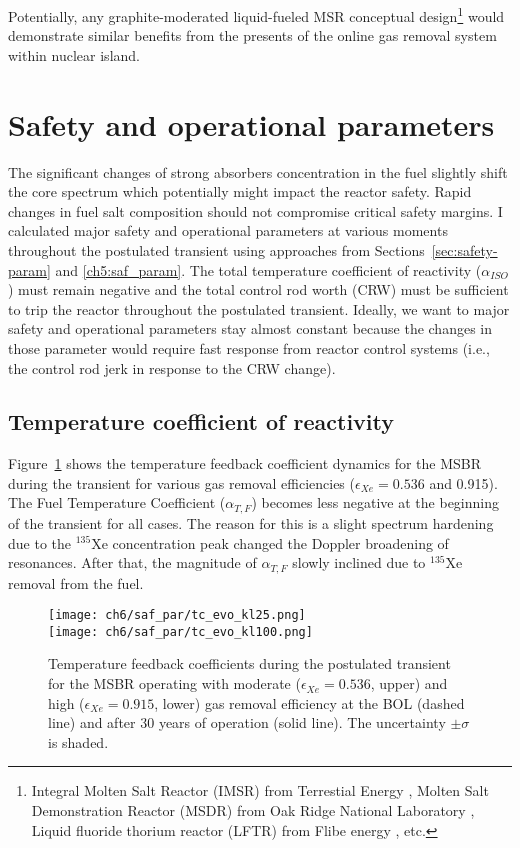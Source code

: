 Potentially, any graphite-moderated liquid-fueled \gls{MSR} conceptual 
design\footnote{Integral Molten Salt Reactor (IMSR) from Terrestial Energy 
\cite{leblanc_integral_nodate}, Molten Salt Demonstration Reactor (MSDR) from 
Oak Ridge National Laboratory \cite{bettis_design_1972}, Liquid fluoride 
thorium reactor (LFTR) from Flibe energy \cite{sorensen_liquid-fluoride_2016}, 
etc.} would demonstrate similar benefits from the presents of the online gas 
removal system within nuclear island.


\section{Safety and operational parameters}
The significant changes of strong absorbers concentration in the fuel slightly 
shift the core spectrum which potentially might impact the reactor safety.
Rapid changes in fuel salt composition should not compromise critical safety 
margins.
I calculated major safety and operational parameters at various moments 
throughout the postulated transient using approaches from 
Sections~\ref{sec:safety-param} and \ref{ch5:saf_param}. 
The total temperature coefficient of reactivity ($\alpha_{ISO}$) must remain 
negative and the total control rod worth (CRW) must be sufficient to trip the 
reactor throughout the postulated transient. Ideally, we want to major safety 
and operational parameters stay almost constant because the changes in those 
parameter would require fast response from reactor control systems (i.e., the 
control rod jerk in response to the CRW change).

\subsection{Temperature coefficient of reactivity}
Figure~\ref{fig:msbr-lf-tc-evo} shows the temperature feedback coefficient 
dynamics for the \gls{MSBR} during the transient for various gas removal 
efficiencies ($\epsilon_{Xe}=0.536$ and 0.915). 
The Fuel Temperature Coefficient ($\alpha_{T,F}$) becomes less negative at the 
beginning of the transient for all cases. The reason for this is a 
slight spectrum hardening due to the $^{135}$Xe concentration peak changed the 
Doppler broadening of resonances. After that, the magnitude of $\alpha_{T,F}$ 
slowly inclined due to $^{135}$Xe removal from the fuel.
\begin{figure}[htbp!] %
	\centering
	\texttt{[image: ch6/saf\_par/tc\_evo\_kl25.png]}\\
	\vspace{-12mm}
	\hspace{+0.05mm}
	\texttt{[image: ch6/saf\_par/tc\_evo\_kl100.png]}
	\vspace{-3mm}
	\caption{Temperature feedback coefficients during the postulated transient 
	for the \gls{MSBR} operating with moderate ($\epsilon_{Xe}=0.536$, upper) 
	and high ($\epsilon_{Xe}=0.915$, lower) gas removal efficiency at the 
	\gls{BOL} (dashed line) and after 30 years of operation (solid line).
	The	uncertainty $\pm\sigma$ is shaded.}
	\label{fig:msbr-lf-tc-evo}
\end{figure}

